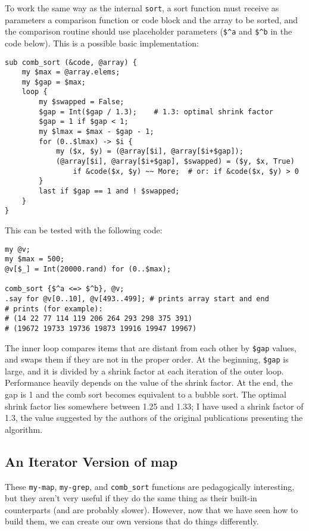 To work the same way as the internal {\tt sort}, a sort 
function must receive as parameters a comparison function 
or code block and the array to be sorted, and the 
comparison routine should use placeholder parameters (\verb'$^a' 
and  \verb'$^b' in the code below). This is a possible 
basic implementation:

\begin{verbatim}
sub comb_sort (&code, @array) {
    my $max = @array.elems;
    my $gap = $max;
    loop {
        my $swapped = False;
        $gap = Int($gap / 1.3);    # 1.3: optimal shrink factor
        $gap = 1 if $gap < 1;
        my $lmax = $max - $gap - 1;
        for (0..$lmax) -> $i {
            my ($x, $y) = (@array[$i], @array[$i+$gap]);
            (@array[$i], @array[$i+$gap], $swapped) = ($y, $x, True)
                if &code($x, $y) ~~ More;  # or: if &code($x, $y) > 0
        }
        last if $gap == 1 and ! $swapped;
    }
}
\end{verbatim}

This can be tested with the following code:

\begin{verbatim}
my @v;
my $max = 500;
@v[$_] = Int(20000.rand) for (0..$max);

comb_sort {$^a <=> $^b}, @v;
.say for @v[0..10], @v[493..499]; # prints array start and end
# prints (for example):
# (14 22 77 114 119 206 264 293 298 375 391)
# (19672 19733 19736 19873 19916 19947 19967)
\end{verbatim}

The inner loop compares items that are distant from each 
other by \verb'$gap' values, and swaps them if they are 
not in the proper order. At the beginning, \verb'$gap' 
is large, and it is divided by a shrink factor at each 
iteration of the outer loop. Performance heavily depends
on the value of the shrink factor. At the end, the gap 
is 1 and the comb sort becomes equivalent to a bubble 
sort. The optimal shrink factor lies somewhere between 1.25 
and 1.33; I have used a shrink factor of 1.3, the value 
suggested by the authors of the original publications 
presenting the algorithm.

	\subsection{An Iterator Version of map}

These {\tt my-map}, {\tt my-grep}, and {\tt comb\_sort} 
functions are pedagogically interesting, but they aren't 
very useful if they do the same thing as their built-in 
counterparts (and are probably slower). However, now 
that we have seen how to build them, we can create our 
own versions that do things differently.

